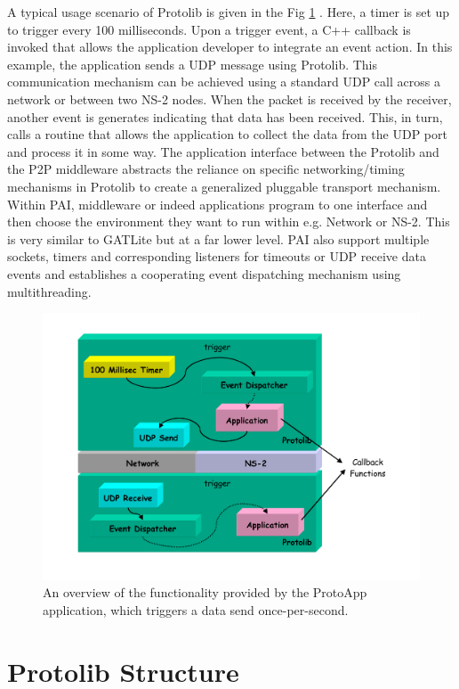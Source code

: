 A typical usage scenario of Protolib is given in the Fig \ref{pai:fig:demo} . Here, a timer is set up to trigger every 100 milliseconds. Upon a trigger event, a C++ callback is invoked that allows the application developer to integrate an event action. In this example, the application sends a UDP message using Protolib.  This communication mechanism can be achieved using a standard UDP call across a network or between two NS-2 nodes.  When the packet is received by the receiver, another event is generates indicating that data has been received.  This, in turn, calls a routine that allows the application to collect the data from the UDP port and process it in some way. The application interface between the Protolib and the P2P middleware abstracts the reliance on specific networking/timing mechanisms in Protolib to create a generalized pluggable transport mechanism. Within PAI, middleware or indeed applications program to one interface and then choose the environment they want to run within e.g.  Network or NS-2. This is very similar to GATLite but at a far lower level.  PAI also support multiple sockets, timers and corresponding listeners for timeouts or UDP receive data events and establishes a cooperating event dispatching mechanism using multithreading.

\begin{figure}
\centering
\includegraphics[scale=0.4]{images/protolibDemo}
\caption{An overview of the functionality provided by the ProtoApp
application, which triggers a data send once-per-second.} 
\label{pai:fig:demo}
\end{figure}

\section{Protolib Structure}

